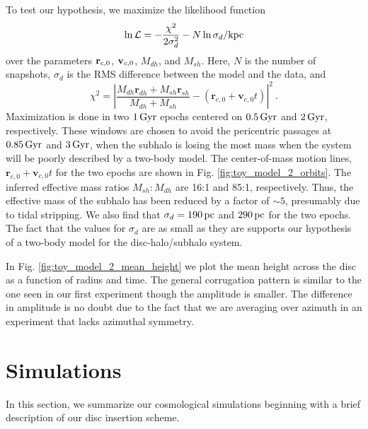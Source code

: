 To test our hypothesis, we maximize the likelihood function
\begin{equation}
\ln \mathcal{L} = -\frac{\chi^2}{2\sigma_d^2} - N\ln\sigma_d / \text{kpc}
\end{equation}
over the parameters ${\bf r}_{c,0}$, ${\bf v}_{c,0}$, $M_{dh}$,
and $M_{sh}$. Here, $N$ is the number of snapshots, {$\sigma_d$ is the RMS difference between the model and the data, }and
\begin{equation}
\chi^2 = \left\vert
\frac{M_{dh}\textbf{r}_{dh} + M_{sh} \textbf{r}_{sh}}{M_{dh} + M_{sh}}
- (\textbf{r}_{c,0} + \textbf{v}_{c,0} t )\right\vert^2~.
\end{equation}
Maximization is done in two $1 \, {\rm Gyr}$  epochs centered on $0.5\,{\rm
  Gyr}$ and $2\,{\rm Gyr}$, respectively. These windows are chosen to
avoid the pericentric passages at $0.85\,{\rm Gyr}$ and $3\,{\rm
  Gyr}$, when the subhalo is losing the most mass when the system will
be poorly described by a two-body model. The center-of-mass motion
lines, $\textbf{r}_{c,0} + \textbf{v}_{c,0} t$ for the two epochs are
shown in Fig. \ref{fig:toy_model_2_orbits}. The inferred effective
mass ratios $M_{sh}:M_{dh}$ are 16:1 and 85:1, respectively.  Thus,
the effective mass of the subhalo has been reduced by a factor of
$\sim 5$, presumably due to tidal stripping. We also find that
$\sigma_d= 190\,{\rm pc}$ and $290\,{\rm pc}$ for the two epochs.  The
fact that the values for $\sigma_d$ are as small as they are supports
our hypothesis of a two-body model for the disc-halo/subhalo system.

In Fig. \ref{fig:toy_model_2_mean_height} we plot the mean height
across the disc as a function of radius and time. The general
corrugation pattern is similar to the one seen in our first experiment
though the amplitude is smaller. The difference in amplitude is no doubt
due to the fact that we are averaging over azimuth in an experiment
that lacks azimuthal symmetry.

\section{Simulations} \label{sec:description}

In this section, we summarize our cosmological simulations beginning
with a brief description of our disc insertion scheme.

